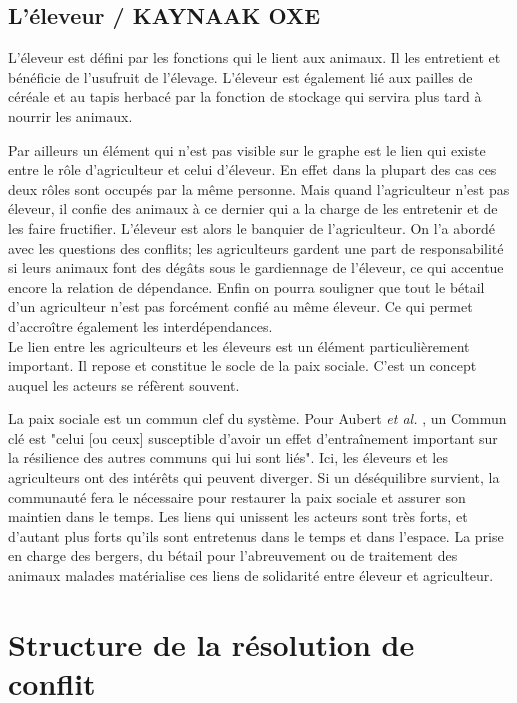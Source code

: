 \subsection{L'éleveur / KAYNAAK OXE}
L'éleveur est défini par les fonctions qui le lient aux animaux. Il les entretient et bénéficie de l'usufruit de l'élevage. L'éleveur est également lié aux pailles de céréale et au tapis herbacé par la fonction de stockage qui servira plus tard à nourrir les animaux.

Par ailleurs un élément qui n'est pas visible sur le graphe est le lien qui existe entre le rôle d'agriculteur et celui d'éleveur. En effet dans la plupart des cas ces deux rôles sont occupés par la même personne. Mais quand l'agriculteur n'est pas éleveur, il confie des animaux à ce dernier qui a la charge de les entretenir et de les faire fructifier. L'éleveur est alors le banquier de l'agriculteur. On l'a abordé avec les questions des conflits; les agriculteurs gardent une part de responsabilité si leurs animaux font des dégâts sous le gardiennage de l'éleveur, ce qui accentue encore la relation de dépendance. Enfin on pourra souligner que tout le bétail d'un agriculteur n'est pas forcément confié au même éleveur. Ce qui permet d'accroître également les interdépendances.\\

Le lien entre les agriculteurs et les éleveurs est un élément particulièrement important. Il repose et constitue le socle de la paix sociale. C'est un concept auquel les acteurs se réfèrent souvent.

La paix sociale est un commun clef du système. Pour Aubert \textit{et al.} \cite{land_tenure_and_development_technical_committee_opportunities_2017}, un Commun clé est "celui [ou ceux] susceptible d’avoir un effet d’entraînement important sur la résilience des autres communs qui lui sont liés". Ici, les éleveurs et les agriculteurs ont des intérêts qui peuvent diverger. Si un déséquilibre survient, la communauté fera le nécessaire pour restaurer la paix sociale et assurer son maintien dans le temps. Les liens qui unissent les acteurs sont très forts, et d'autant plus forts qu'ils sont entretenus dans le temps et dans l'espace. La prise en charge des bergers, du bétail pour l'abreuvement ou de traitement des animaux malades matérialise ces liens de solidarité entre éleveur et agriculteur.

\section{Structure de la résolution de conflit}


